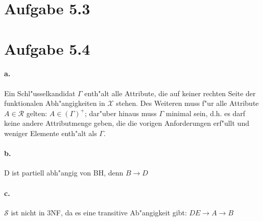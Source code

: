 \documentclass{article}
\begin{document}
	
	
	\section*{Aufgabe 5.3}
	
	
	
	
	\section*{Aufgabe 5.4}
		\paragraph*{a.}Ein Schl"usselkandidat $ \Gamma $ enth"alt alle Attribute, die auf keiner rechten Seite der funktionalen Abh"angigkeiten in $ \mathcal{X} $ stehen. Des Weiteren muss f"ur alle Attribute $A \in \mathcal{R} $ gelten: $ A \in (\Gamma)^+ $; dar"uber hinaus muss $ \Gamma $ minimal sein, d.h. es darf keine andere Attributmenge geben, die die vorigen Anforderungen erf"ullt und weniger Elemente enth"alt als $ \Gamma $. \\[1.1em]
		
		
		
		\paragraph*{b.} D ist partiell abh"angig von BH, denn $ B \rightarrow D $ 
		
		
		\paragraph*{c.}$ \mathcal{S} $ ist nicht in 3NF, da es eine transitive Ab"angigkeit gibt: $ DE \rightarrow A \rightarrow B $
\end{document}
